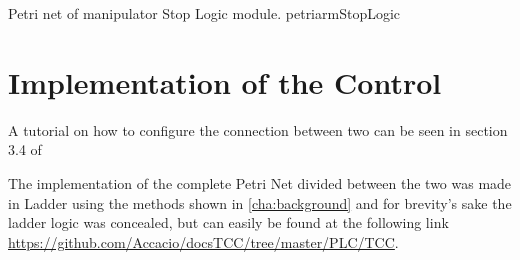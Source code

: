 {Petri net of manipulator Stop Logic module.}
{petriarmStopLogic}

\section{Implementation of the Control}
A tutorial on how to configure the connection between two \PLCs{} can be seen in
section 3.4 of \cite{rochapereira2019automacao}

The implementation of the complete Petri Net divided between the two \PLCs{} was
made in Ladder using the methods shown in \autoref{cha:background}  and for
brevity's sake the ladder logic was concealed, but can easily be
found at the following link
\url{https://github.com/Accacio/docsTCC/tree/master/PLC/TCC}.




